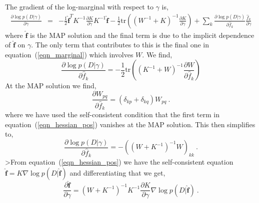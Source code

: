 \documentclass[10pt]{article}
\begin{document}
The gradient of the log-marginal with respect to $\gamma$ is,
\begin{eqnarray}
\frac{\partial \log p(D|\gamma)}{\partial \gamma}& = &
-\mbox{$\frac{1}{2}$}\hat{\bm f}^T K^{-1}\frac{\partial K}{\partial \gamma} K^{-1}\hat{\bm f} - 
\mbox{$\frac{1}{2}$}\mbox{tr}\left((W^{-1}+K)^{-1}\frac{\partial
  K}{\partial \gamma}\right) + \sum_k \frac{\partial \log p(D|\gamma)}{\partial \hat{f}_k}\frac{\hat{f}_k}{\partial \gamma}
\end{eqnarray}
where $\hat{\bm
  f}$ is the MAP solution and the final term is due to the implicit dependence of $\hat{\bm
  f}$ on $\gamma$. The only term that contributes to this is the final
  one in equation~(\ref{eqn_marginal}) which involves $W$. We find,
\begin{equation}
  \frac{\partial \log p(D|\gamma)}{\partial \hat{f}_k} =
  -\frac{1}{2}\mbox{tr}\left( (K^{-1}+W)^{-1}\frac{\partial
  W}{\partial \hat{f}_k}\right) 
\end{equation}
At the MAP solution we find,
\[
\frac{\partial W_{pq}}{\partial \hat{f}_k} =
(\delta_{kp}+\delta_{kq})W_{pq} \ .
\]
where we have used the self-consistent condition that the first term in
equation~(\ref{eqn_hessian_pos}) vanishes at the MAP solution. This
  then simplifies to,
\[
\frac{\partial \log p(D|\gamma)}{\partial \hat{f}_k} =
-((W+K^{-1})^{-1}W)_{kk} \ .
\]
>From equation~(\ref{eqn_hessian_pos}) we have the
self-consistent equation $\hat{\bm f}=K\nabla\log p(D|\hat{\bm f})$
and differentiating that we get,
\begin{equation}
\frac{\partial \hat{\bm f}}{\partial \gamma} = (W+K^{-1})^{-1}K^{-1}\frac{\partial
  K}{\partial \gamma} \nabla \log p(D|\hat{\bm f}) \ .
\end{equation}
\end{document}
